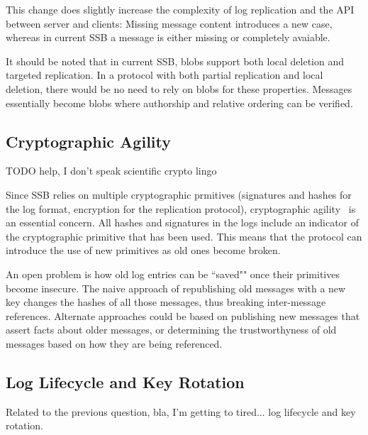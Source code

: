 \documentclass[sigconf]{acmart}
\begin{document}
This change does slightly increase the complexity of log replication and the API between server and clients: Missing message content introduces a new case, whereas in current SSB a message is either missing or completely avaiable.

It should be noted that in current SSB, blobs support both local deletion and targeted replication. In a protocol with both partial replication and local deletion, there would be no need to rely on blobs for these properties. Messages essentially become blobs where authorship and relative ordering can be verified.

\subsection{Cryptographic Agility}

TODO help, I don't speak scientific crypto lingo

Since SSB relies on multiple cryptographic prmitives (signatures and hashes for the log format, encryption for the replication protocol), cryptographic agility~\cite{nelson2011crypto} is an essential concern. All hashes and signatures in the logs include an indicator of the cryptographic primitive that has been used. This means that the protocol can introduce the use of new primitives as old ones become broken.

An open problem is how old log entries can be ``saved"" once their primitives become insecure. The naive approach of republishing old messages with a new key changes the hashes of all those messages, thus breaking inter-message references. Alternate approaches could be based on publishing new messages that assert facts about older messages, or determining the trustworthyness of old messages based on how they are being referenced.

\subsection{Log Lifecycle and Key Rotation}

Related to the previous question, bla, I'm getting to tired... log lifecycle and key rotation.

%
%
%
%
%
%
%
%
\end{document}
